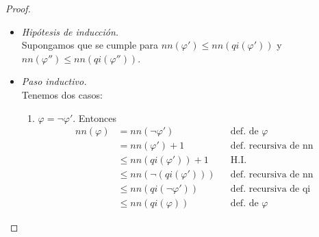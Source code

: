 \documentclass[letterpaper,12pt]{article}
\begin{document}
\begin{enumerate}
\begin{enumerate}
\begin{proof}
\begin{itemize}
                \item \textit{Hipótesis de inducción.} \\
                Supongamos que se cumple para $nn(\varphi ') \leq nn(qi(\varphi '))$
                y $nn(\varphi '') \leq nn(qi(\varphi ''))$.

                \newpage
                \item \textit{Paso inductivo.} \\
                Tenemos dos casos:
                \begin{enumerate}
                    \item $\varphi = \neg \varphi '$. Entonces 
                    \begin{align*}
                        nn(\varphi) &= nn(\neg \varphi ')
                        && \text{def. de $\varphi$} \\
                        &= nn(\varphi ') + 1
                        && \text{def. recursiva de nn} \\
                        &\leq nn(qi(\varphi ')) + 1
                        && \text{H.I.} \\
                        &\leq nn(\neg (qi(\varphi '))) 
                        && \text{def. recursiva de nn} \\
                        &\leq nn(qi(\neg \varphi '))
                        && \text{def. recursiva de qi} \\
                        &\leq nn(qi(\varphi))
                        && \text{def. de $\varphi$}
                    \end{align*}
                    

\end{enumerate}
\end{itemize}
\end{proof}
\end{enumerate}
\end{enumerate}
\end{document}
